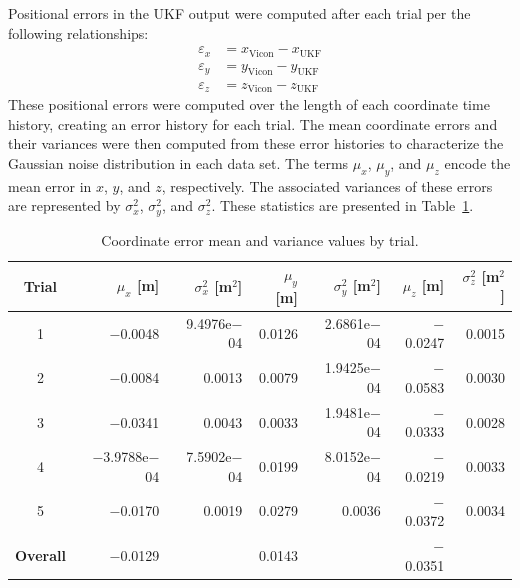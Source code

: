 Positional errors in the UKF output were computed after each trial per the following relationships:
%
\begin{align}
\varepsilon_{x} &= x_{\text{Vicon}} - x_{\text{UKF}} \\
\varepsilon_{y} &= y_{\text{Vicon}} - y_{\text{UKF}} \\
\varepsilon_{z} &= z_{\text{Vicon}} - z_{\text{UKF}}
\end{align}
%
These positional errors were computed over the length of each coordinate time history, creating an error history for each trial. The mean coordinate errors and their variances were then computed from these error histories to characterize the Gaussian noise distribution in each data set. The terms $\mu_{x}$, $\mu_{y}$, and $\mu_{z}$ encode the mean error in $x$, $y$, and $z$, respectively. The associated variances of these errors are represented by $\sigma_{x}^{2}$, $\sigma_{y}^{2}$, and $\sigma_{z}^{2}$. These statistics are presented in Table~\ref{tab:means_and_vars}.

\begin{table}[h]\centering
\caption[Coordinate Error]{Coordinate error mean and variance values by trial.}
\begin{tabular}[c]{crr|rr|rr}
\toprule
Trial & $\mu_{x}$ [m] & $\sigma_{x}^{2}$ [m$^{2}$] & $\mu_{y}$ [m] & $\sigma_{y}^{2}$ [m$^{2}$] & $\mu_{z}$ [m] & $\sigma_{z}^{2}$ [m$^{2}$] \\
\hline
1 & $-$0.0048 & 9.4976e$-$04 & 0.0126 & 2.6861e$-$04 & $-$0.0247 & 0.0015 \\
2 & $-$0.0084 & 0.0013 & 0.0079 & 1.9425e$-$04 & $-$0.0583 & 0.0030 \\
3 & $-$0.0341 & 0.0043 & 0.0033 & 1.9481e$-$04 & $-$0.0333 & 0.0028 \\
4 & $-$3.9788e$-$04 & 7.5902e$-$04 & 0.0199 & 8.0152e$-$04 & $-$0.0219 & 0.0033 \\
5 & $-$0.0170 & 0.0019 & 0.0279 & 0.0036 & $-$0.0372 & 0.0034 \\
\hline
\textbf{Overall} & $-$0.0129 &  & 0.0143 &  & $-$0.0351 & \\
\bottomrule
\end{tabular}
\label{tab:means_and_vars}
\end{table}

